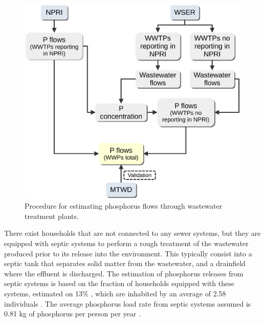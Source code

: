 \documentclass[authoryear]{elsarticle}
\begin{document}

\begin{figure}[H]
	\centering
	\includegraphics[width=0.6\linewidth, trim={0cm 0cm 0cm 0cm},clip]{Figures/FigJorge.pdf} 
	\caption{Procedure for estimating phosphorus flows through wastewater treatment plants.}
	\label{fig:MethodWWTPs}
\end{figure}

There exist households that are not connected to any sewer systems, but they are equipped with septic systems to perform a rough treatment of the wastewater produced prior to its release into the environment. This typically consist into a septic tank that separates solid matter from the wastewater, and a drainfield where the effluent is discharged. The estimation of phosphorus releases from septic systems is based on the fraction of households equipped with these systems, estimated on 13\% \citep{CanadaSepticSystems}, which are inhabited by an average of 2.58 individuals \citep{CanadaPersonPerHouse}. The average phosphorus load rate from septic systems assumed is 0.81 kg of phosphorus per person per year
\citep{oldfield2020estimation}.
\end{document}
